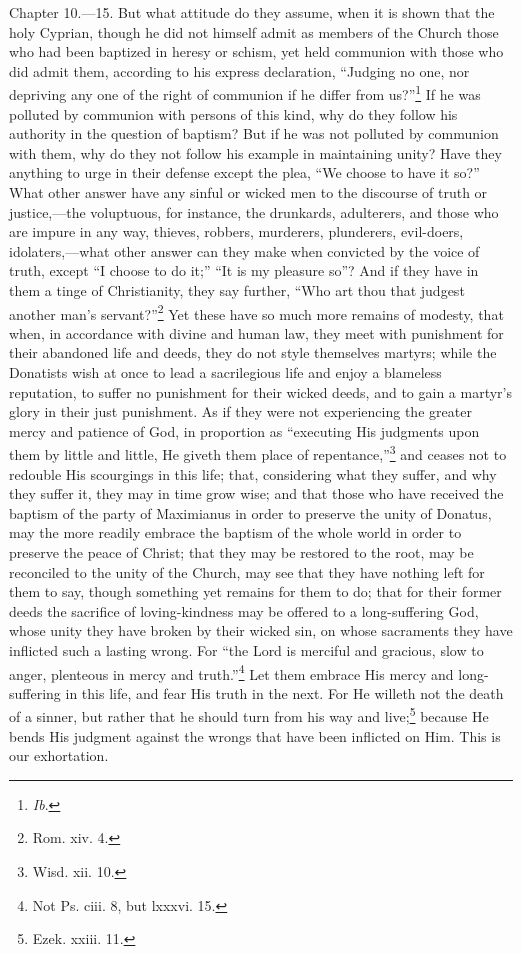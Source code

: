 Chapter 10.—15. But what attitude do they assume, when it is shown that the holy Cyprian, though he did not himself admit as members of the Church those who had been baptized in heresy or schism, yet held communion with those who did admit them, according to his express declaration, ``Judging no one, nor depriving any one of the right of communion if he differ from us?''\footnote{\par  \emph{Ib}.} If he was polluted by communion with persons of this kind, why do they follow his authority in the question of baptism? But if he was not polluted by communion with them, why do they not follow his example in maintaining unity? Have they anything to urge in their defense except the plea, ``We choose to have it so?'' What other answer have any sinful or wicked men to the discourse of truth or justice,—the voluptuous, for instance, the drunkards, adulterers, and those who are impure in any way, thieves, robbers, murderers, plunderers, evil-doers, idolaters,—what other answer can they make when convicted by the voice of truth, except ``I choose to do it;'' ``It is my pleasure so''? And if they have in them a tinge of Christianity, they say further, ``Who art thou that judgest another man’s servant?''\footnote{\par  Rom. xiv. 4.} Yet these have so much more remains of modesty, that when, in accordance with divine and human law, they meet with punishment for their abandoned life and deeds, they do not style themselves martyrs; while the Donatists wish at once to lead a sacrilegious life and enjoy a blameless reputation, to suffer no punishment for their wicked deeds, and to gain a martyr’s glory in their just punishment. As if they were not experiencing the greater mercy and patience of God, in proportion as ``executing His judgments upon them by little and little, He giveth them place of repentance,''\footnote{\par  Wisd. xii. 10.} and ceases not to redouble His scourgings in this life; that, considering what they suffer, and why they suffer it, they may in time grow wise; and that those who have received the baptism of the party of Maximianus in order to preserve the unity of Donatus, may the more readily embrace the baptism of the whole world in order to preserve the peace of Christ; that they may be restored to the root, may be reconciled to the unity of the Church, may see that they have nothing left for them to say, though something yet remains for them to do; that for their former deeds the sacrifice of loving-kindness may be offered to a long-suffering God, whose unity they have broken by their wicked sin, on whose sacraments they have inflicted such a lasting wrong. For ``the Lord is merciful and gracious, slow to anger, plenteous in mercy and truth.''\footnote{\par  Not Ps. ciii. 8, but lxxxvi. 15.} Let them embrace His mercy and long-suffering in this life, and fear His truth in the next. For He willeth not the death of a sinner, but rather that he should turn from his way and live;\footnote{\par  Ezek. xxiii. 11.} because He bends His judgment against the wrongs that have been inflicted on Him. This is our exhortation.

